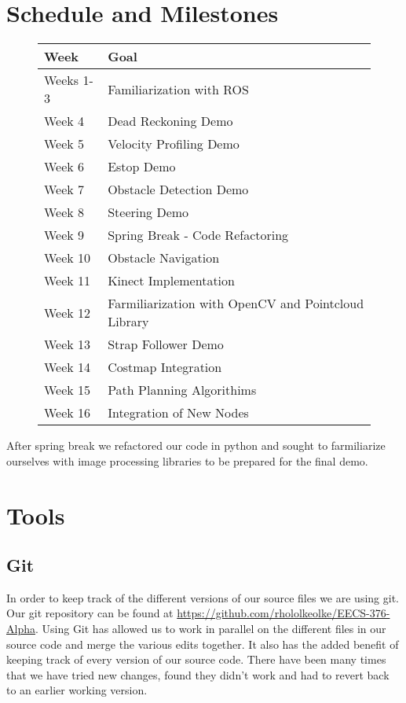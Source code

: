 
\newpage
\section{Schedule and Milestones}

\FloatBarrier
\begin{figure}[h]
\begin{longtable}{|l|l|}
  \hline {\bf Week} & {\bf Goal} \\ \hline
Weeks 1-3 & Familiarization with ROS \\ \hline
Week 4 & Dead Reckoning Demo \\ \hline
Week 5 & Velocity Profiling Demo \\ \hline
Week 6 & Estop Demo \\ \hline
Week 7 & Obstacle Detection Demo \\ \hline
Week 8 & Steering Demo \\ \hline
Week 9 & Spring Break - Code Refactoring \\ \hline
Week 10 & Obstacle Navigation \\ \hline
Week 11 & Kinect Implementation \\ \hline
Week 12 & Farmiliarization with OpenCV and Pointcloud Library \\ \hline
Week 13 & Strap Follower Demo \\ \hline
Week 14 & Costmap Integration \\ \hline
Week 15 & Path Planning Algorithims \\ \hline
Week 16 & Integration of New Nodes \\ \hline
\end{longtable}
\end{figure}
\FloatBarrier

After spring break we refactored our code in python and sought to farmiliarize ourselves with image processing libraries to be prepared for the final demo.

\section{Tools}

\subsection{Git}
In order to keep track of the different versions of our source files
we are using git.  Our git repository can be found at
\url{https://github.com/rhololkeolke/EECS-376-Alpha}.  Using Git has
allowed us to work in parallel on the different files in our source
code and merge the various edits together.  It also has the added
benefit of keeping track of every version of our source code. There
have been many times that we have tried new changes, found they didn't
work and had to revert back to an earlier working version.

